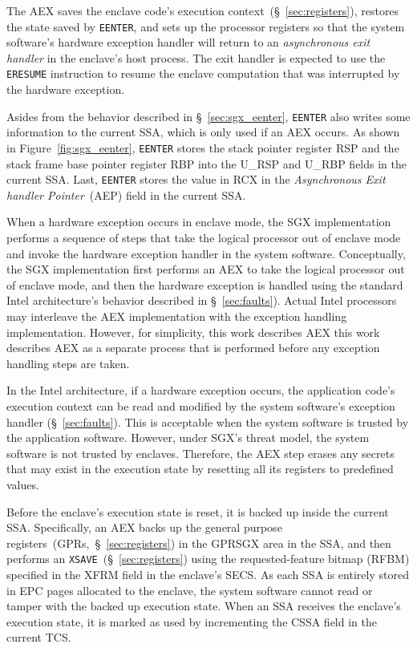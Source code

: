 
The AEX saves the enclave code's execution context~(\S~\ref{sec:registers}),
restores the state saved by \texttt{EENTER}, and sets up the processor
registers so that the system software's hardware exception handler will return
to an \textit{asynchronous exit handler} in the enclave's host process. The
exit handler is expected to use the \texttt{ERESUME} instruction to resume the
enclave computation that was interrupted by the hardware exception.

Asides from the behavior described in \S~\ref{sec:sgx_eenter}, \texttt{EENTER}
also writes some information to the current SSA, which is only used if an AEX
occurs. As shown in Figure~\ref{fig:sgx_eenter}, \texttt{EENTER} stores the
stack pointer register RSP and the stack frame base pointer register RBP into
the U\_RSP and U\_RBP fields in the current SSA. Last, \texttt{EENTER} stores
the value in RCX in the \textit{Asynchronous Exit handler Pointer}~(AEP) field
in the current SSA.

When a hardware exception occurs in enclave mode, the SGX implementation
performs a sequence of steps that take the logical processor out of enclave
mode and invoke the hardware exception handler in the system software.
Conceptually, the SGX implementation first performs an AEX to take the logical
processor out of enclave mode, and then the hardware exception is handled
using the standard Intel architecture's behavior described in
\S~\ref{sec:faults}). Actual Intel processors may interleave the AEX
implementation with the exception handling implementation. However, for
simplicity, this work describes AEX this work describes AEX as a separate
process that is performed before any exception handling steps are taken.

In the Intel architecture, if a hardware exception occurs, the application
code's execution context can be read and modified by the system software's
exception handler (\S~\ref{sec:faults}). This is acceptable when the system
software is trusted by the application software. However, under SGX's threat
model, the system software is not trusted by enclaves. Therefore, the AEX step
erases any secrets that may exist in the execution state by resetting all its
registers to predefined values.


Before the enclave's execution state is reset, it is backed up inside the
current SSA. Specifically, an AEX backs up the general purpose
registers~(GPRs,~\S~\ref{sec:registers}) in the GPRSGX area in the SSA, and
then performs an \texttt{XSAVE}~(\S~\ref{sec:registers}) using the
requested-feature bitmap (RFBM) specified in the XFRM field in the enclave's
SECS. As each SSA is entirely stored in EPC pages allocated to the enclave, the
system software cannot read or tamper with the backed up execution state. When
an SSA receives the enclave's execution state, it is marked as used by
incrementing the CSSA field in the current TCS.

